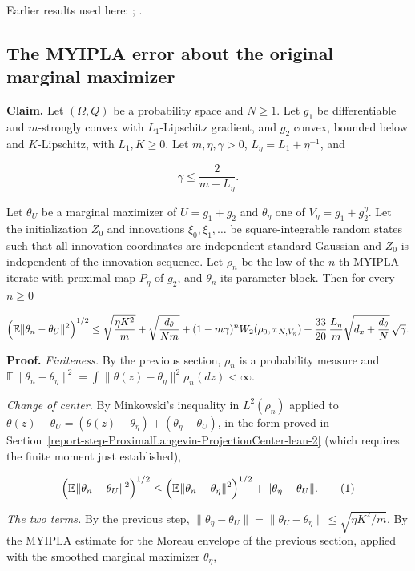 \documentclass[11pt,a4paper]{report}
\begin{document}
Earlier results used here: \cite[Section~3.1.1]{LangevinLean2026IPLA}; \cite[Section~3.3.1]{LangevinLean2026IPLA}.
\subsection{\texorpdfstring{The MYIPLA error about the original marginal maximizer}{The MYIPLA error about the original marginal maximizer}}
\label{report-step-ProximalLangevin-Theorem-lean-3}


\textbf{Claim.} Let \((\Omega,Q)\) be a probability space and \(N\ge1\). Let \(g_1\) be differentiable and \(m\)-strongly convex with \(L_1\)-Lipschitz gradient, and \(g_2\) convex, bounded below and \(K\)-Lipschitz, with \(L_1,K\ge0\). Let \(m,\eta,\gamma>0\), \(L_\eta=L_1+\eta^{-1}\), and


\[\gamma\le\frac{2}{m+L_\eta}.\]


Let \(\theta_U\) be a marginal maximizer of \(U=g_1+g_2\) and \(\theta_\eta\) one of \(V_\eta=g_1+g_2^\eta\). Let the initialization \(Z_0\) and innovations \(\xi_0,\xi_1,\dots\) be square-integrable random states such that all innovation coordinates are independent standard Gaussian and \(Z_0\) is independent of the innovation sequence. Let \(\rho_n\) be the law of the \(n\)-th MYIPLA iterate with proximal map \(P_\eta\) of \(g_2\), and \(\theta_n\) its parameter block. Then for every \(n\ge0\)


\[\Bigl(\mathbb E\|\theta_n-\theta_U\|^2\Bigr)^{1/2}\le\sqrt{\frac{\eta K^2}{m}}+\sqrt{\frac{d_\theta}{Nm}}+(1-m\gamma)^nW_2(\rho_0,\pi_{N,V_\eta})+\frac{33}{20}\,\frac{L_\eta}{m}\sqrt{d_x+\frac{d_\theta}N}\,\sqrt\gamma .\]


\textbf{Proof.} \emph{Finiteness.} By the previous section, \(\rho_n\) is a probability measure and \(\mathbb E\|\theta_n-\theta_\eta\|^2=\int\|\theta(z)-\theta_\eta\|^2\rho_n(dz)<\infty\).




\emph{Change of center.} By Minkowski's inequality in \(L^2(\rho_n)\) applied to \(\theta(z)-\theta_U=(\theta(z)-\theta_\eta)+(\theta_\eta-\theta_U)\), in the form proved in Section~\ref{report-step-ProximalLangevin-ProjectionCenter-lean-2} (which requires the finite moment just established),


\[\Bigl(\mathbb E\|\theta_n-\theta_U\|^2\Bigr)^{1/2}\le\Bigl(\mathbb E\|\theta_n-\theta_\eta\|^2\Bigr)^{1/2}+\|\theta_\eta-\theta_U\|.\qquad(1)\]


\emph{The two terms.} By the previous step, \(\|\theta_\eta-\theta_U\|=\|\theta_U-\theta_\eta\|\le\sqrt{\eta K^2/m}\). By the MYIPLA estimate for the Moreau envelope of the previous section, applied with the smoothed marginal maximizer \(\theta_\eta\),
\end{document}
